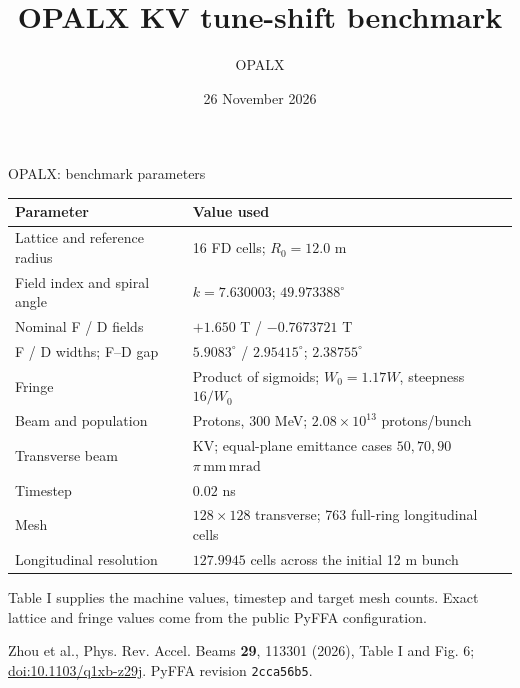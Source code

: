 \documentclass[aspectratio=169,11pt]{beamer}
\title{OPALX KV tune-shift benchmark}
\author{OPALX}
\date{26 November 2026}
\newcommand{\src}[1]{\par\vfill{\color{muted}\scriptsize #1\par}}
\newcommand{\epsunit}{\ensuremath{\pi\,\mathrm{mm\,mrad}}}
\begin{document}
\begin{frame}{OPALX: benchmark parameters}
\small
\begin{tabularx}{\linewidth}{lY}
\toprule Parameter & Value used \\
\midrule
Lattice and reference radius & 16 FD cells; $R_0=12.0$ m \\
Field index and spiral angle & $k=7.630003$; $49.973388^\circ$ \\
Nominal F / D fields & $+1.650$ T / $-0.7673721$ T \\
F / D widths; F--D gap & $5.9083^\circ$ / $2.95415^\circ$; $2.38755^\circ$ \\
Fringe & Product of sigmoids; $W_0=1.17W$, steepness $16/W_0$ \\
Beam and population & Protons, $300$ MeV; $2.08\times10^{13}$ protons/bunch \\
Transverse beam & KV; equal-plane emittance cases $50,70,90$ \epsunit \\
Timestep & $0.02$ ns \\
Mesh & $128\times128$ transverse; 763 full-ring longitudinal cells \\
Longitudinal resolution & $127.9945$ cells across the initial 12 m bunch \\
\bottomrule
\end{tabularx}\par
\vspace{3mm}
\footnotesize Table I supplies the machine values, timestep and target mesh counts. Exact lattice and fringe values come from the public PyFFA configuration.
\src{Zhou et al., Phys. Rev. Accel. Beams \textbf{29}, 113301 (2026), Table I and Fig. 6; \href{https://doi.org/10.1103/q1xb-z29j}{doi:10.1103/q1xb-z29j}. PyFFA revision \texttt{2cca56b5}.}
\end{frame}
\end{document}
